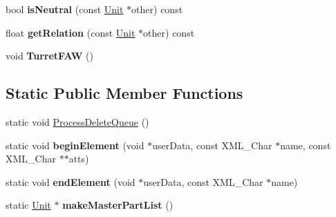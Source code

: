 \begin{DoxyCompactItemize}
\item 
bool {\bfseries is\+Neutral} (const \hyperlink{classUnit}{Unit} $\ast$other) const \hypertarget{classUnit_a868c0657af56e917dcf338fcbc70811a}{}\label{classUnit_a868c0657af56e917dcf338fcbc70811a}

\item 
float {\bfseries get\+Relation} (const \hyperlink{classUnit}{Unit} $\ast$other) const \hypertarget{classUnit_afdcbc8da1e8dda74d68d0f3046ad892f}{}\label{classUnit_afdcbc8da1e8dda74d68d0f3046ad892f}

\item 
void {\bfseries Turret\+F\+AW} ()\hypertarget{classUnit_a086b7da100f0fe20e35b47b80d05ac69}{}\label{classUnit_a086b7da100f0fe20e35b47b80d05ac69}

\end{DoxyCompactItemize}
\subsection*{Static Public Member Functions}
\begin{DoxyCompactItemize}
\item 
static void \hyperlink{classUnit_af7dc49d6e2d3d0e91ea042c5ee0543b8}{Process\+Delete\+Queue} ()
\item 
static void {\bfseries begin\+Element} (void $\ast$user\+Data, const X\+M\+L\+\_\+\+Char $\ast$name, const X\+M\+L\+\_\+\+Char $\ast$$\ast$atts)\hypertarget{classUnit_ae62bd54c1521b16847a1daa3989ac5f7}{}\label{classUnit_ae62bd54c1521b16847a1daa3989ac5f7}

\item 
static void {\bfseries end\+Element} (void $\ast$user\+Data, const X\+M\+L\+\_\+\+Char $\ast$name)\hypertarget{classUnit_aa0aaecaff7d8b780da3a1891e7a3caf5}{}\label{classUnit_aa0aaecaff7d8b780da3a1891e7a3caf5}

\item 
static \hyperlink{classUnit}{Unit} $\ast$ {\bfseries make\+Master\+Part\+List} ()\hypertarget{classUnit_afaa68c0d71f482ec0ec61c9c12151ac9}{}\label{classUnit_afaa68c0d71f482ec0ec61c9c12151ac9}

\end{DoxyCompactItemize}
